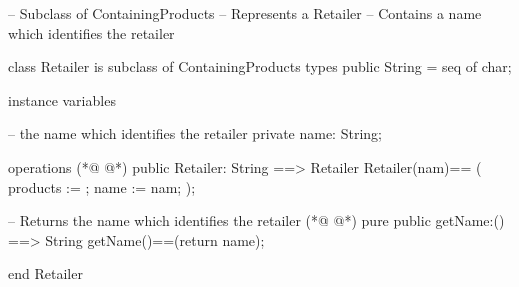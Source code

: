 \begin{vdmpp}[breaklines=true]
-- Subclass of ContainingProducts
-- Represents a Retailer
-- Contains a name which identifies the retailer

class Retailer is subclass of ContainingProducts
  types
    public String = seq of char;
        
    instance variables
    
        -- the name which identifies the retailer
        private name: String;
    
  operations 
(*@
\label{Retailer:15}
@*)
       public Retailer: String ==> Retailer
     Retailer(nam)==
     (
     products := {};
     name := nam;
     );
            
      -- Returns the name which identifies the retailer      
(*@
\label{getName:23}
@*)
      pure public getName:() ==> String
     getName()==(return name);

end Retailer
\end{vdmpp}
